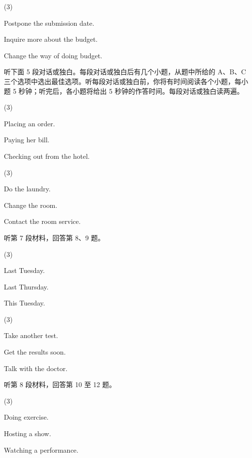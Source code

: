 \documentclass{英语试卷}
\begin{document}
\begin{choices}(3)
  \item Postpone the submission date.
  \item Inquire more about the budget.
  \item Change the way of doing budget.
\end{choices}
\par 听下面 5 段对话或独白。每段对话或独白后有几个小题，从题中所给的 A、B、C 三个选项中选出最佳选项。听每段对话或独白前，你将有时间阅读各个小题，每小题 5 秒钟；听完后，各小题将给出 5 秒钟的作答时间。每段对话或独白读两遍。\par
{}
\begin{choices}(3)
  \item Placing an order.
  \item Paying her bill.
  \item Checking out from the hotel.
\end{choices}
\begin{choices}(3)
  \item Do the laundry.
  \item Change the room.
  \item Contact the room service.
\end{choices}
\par 听第 7 段材料，回答第 8、9 题。\par
{}
\begin{choices}(3)
  \item Last Tuesday.
  \item Last Thursday.
  \item This Tuesday.
\end{choices}
\begin{choices}(3)
  \item Take another test.
  \item Get the results soon.
  \item Talk with the doctor.
\end{choices}
\par 听第 8 段材料，回答第 10 至 12 题。\par
{}
\begin{choices}(3)
  \item Doing exercise.
  \item Hosting a show.
  \item Watching a performance.
\end{choices}
\end{document}
